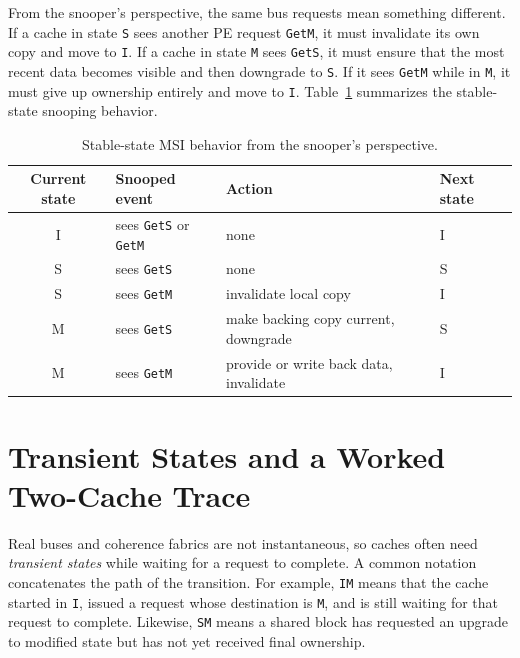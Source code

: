 From the snooper's perspective, the same bus requests mean something different.
If a cache in state \texttt{S} sees another PE request \texttt{GetM}, it must invalidate its own copy and move to \texttt{I}.
If a cache in state \texttt{M} sees \texttt{GetS}, it must ensure that the most recent data becomes visible and then downgrade to \texttt{S}.
If it sees \texttt{GetM} while in \texttt{M}, it must give up ownership entirely and move to \texttt{I}.
Table~\ref{tab:mp-msi-snooper} summarizes the stable-state snooping behavior.
\begin{table}[t]
    \centering
    \renewcommand{\arraystretch}{1.15}
    \begin{tabular}{|c|l|l|l|}
        \hline
        Current state & Snooped event                       & Action                                 & Next state \\
        \hline
        I             & sees \texttt{GetS} or \texttt{GetM} & none                                   & I          \\
        \hline
        S             & sees \texttt{GetS}                  & none                                   & S          \\
        \hline
        S             & sees \texttt{GetM}                  & invalidate local copy                  & I          \\
        \hline
        M             & sees \texttt{GetS}                  & make backing copy current, downgrade & S          \\
        \hline
        M             & sees \texttt{GetM}                  & provide or write back data, invalidate & I          \\
        \hline
    \end{tabular}
    \caption{Stable-state MSI behavior from the snooper's perspective.}
    \label{tab:mp-msi-snooper}
\end{table}


\section{Transient States and a Worked Two-Cache Trace}\label{sec:mp-msi-trace}
Real buses and coherence fabrics are not instantaneous, so caches often need \textit{transient states} while waiting for a request to complete.
A common notation concatenates the path of the transition.
For example, \texttt{IM} means that the cache started in \texttt{I}, issued a request whose destination is \texttt{M}, and is still waiting for that request to complete.
Likewise, \texttt{SM} means a shared block has requested an upgrade to modified state but has not yet received final ownership.


